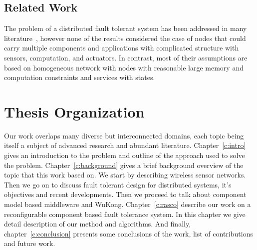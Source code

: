 \subsection{Related Work}

The problem of a distributed fault tolerant system has been addressed in many
literature~\cite{Neumann2010,Lamport2001,Luna2008,Liu2009,Sussman2000,Lynch2002},
however none of the results considered the case of nodes that could carry
multiple components and applications with complicated structure with sensors,
computation, and actuators. In contrast, most of their assumptions
are based on homogeneous network with nodes with reasonable large memory and computation constraints and services with states.

\section{Thesis Organization}

Our work overlaps many diverse but interconnected domains, each topic being 
itself a subject of advanced research and abundant literature.
Chapter~\ref{c:intro} gives an introduction to the problem and outline of the
approach used to solve the problem. Chapter~\ref{c:background}
gives a brief background overview of the topic that this work based on. 
We start by describing wireless sensor networks. Then we go on to discuss fault
tolerant design for distributed systems, it's objectives and recent
developments. Then we proceed to talk about component model based middleware and WuKong. Chapter~\ref{c:rasco} describe our work on a reconfigurable component 
based fault tolerance system. In this chapter we give detail description of our method and algorithms.%
And finally, chapter~\ref{c:conclusion} presents some conclusions of the work, list of contributions and future work.
